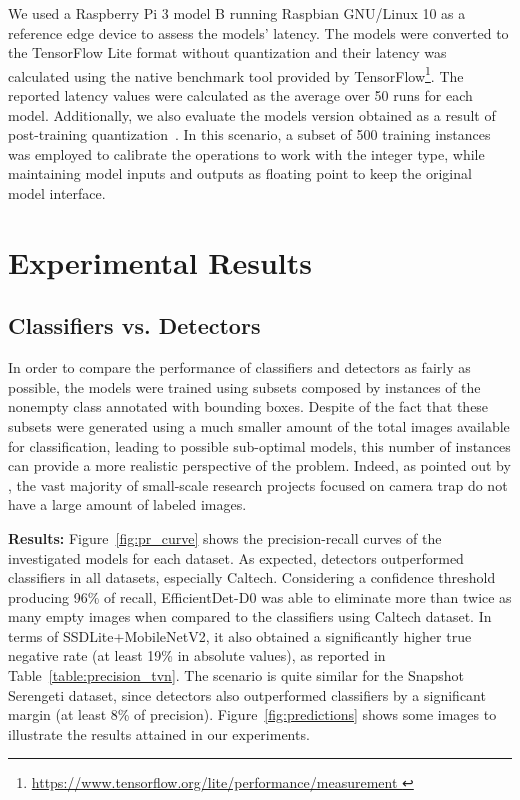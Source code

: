 We used a Raspberry Pi 3 model B running Raspbian GNU/Linux 10 as a reference
edge device to assess the models' latency. The models were converted to the
TensorFlow Lite format without quantization and their latency was calculated
using the native benchmark tool provided by
TensorFlow\footnote{\url{https://www.tensorflow.org/lite/performance/measurement
}}. The reported latency values were calculated as the average over 50 runs for
each model. Additionally, we also evaluate the models version obtained as a
result of post-training quantization~\citep{jacob2018quantization}. In this
scenario, a subset of 500 training instances was employed to calibrate the
operations to work with the integer type, while maintaining model inputs and
outputs as floating point to keep the original model interface.

\section{Experimental Results}

\subsection{Classifiers vs. Detectors}

In order to compare the performance of classifiers and detectors as fairly as
possible, the models were trained using subsets composed by instances of the
nonempty class annotated with bounding boxes. Despite of the fact that these
subsets were generated using a much smaller amount of the total images
available for classification, leading to possible sub-optimal models, this
number of instances can provide a more realistic perspective of the problem.
Indeed, as pointed out by \citet{schneider2020three}, the vast majority of
small-scale research projects focused on camera trap do not have a large amount
of labeled images.

\textbf{Results:} Figure~\ref{fig:pr_curve} shows the precision-recall curves of
the investigated models for each dataset. As expected, detectors outperformed
classifiers in all datasets, especially Caltech. Considering a confidence
threshold producing 96\% of recall, EfficientDet-D0 was able to eliminate more
than twice as many empty images when compared to the classifiers using Caltech
dataset. In terms of SSDLite+MobileNetV2, it also obtained a significantly
higher true negative rate (at least 19\% in absolute values), as reported in
Table~\ref{table:precision_tvn}. The scenario is quite similar for the Snapshot
Serengeti dataset, since detectors also outperformed classifiers by a
significant margin (at least 8\% of precision). Figure~\ref{fig:predictions}
shows some images to illustrate the results attained in our experiments.


